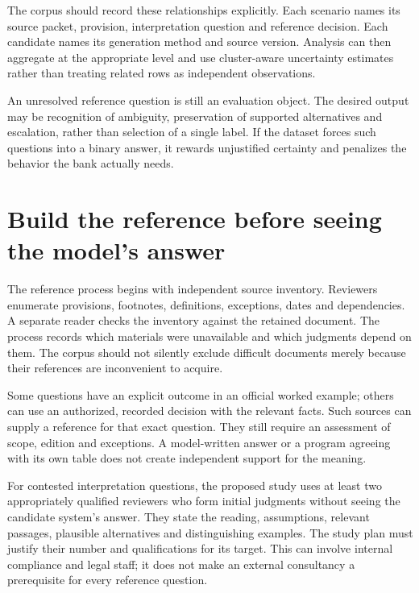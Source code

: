 The corpus should record these relationships explicitly. Each scenario names its
source packet, provision, interpretation question and reference decision. Each
candidate names its generation method and source version. Analysis can then
aggregate at the appropriate level and use cluster-aware uncertainty estimates
rather than treating related rows as independent observations.

An unresolved reference question is still an evaluation object. The desired
output may be recognition of ambiguity, preservation of supported alternatives
and escalation, rather than selection of a single label. If the dataset forces
such questions into a binary answer, it rewards unjustified certainty and
penalizes the behavior the bank actually needs.

\section{Build the reference before seeing the model's answer}
\label{merge:M09:02}


The reference process begins with independent source inventory. Reviewers enumerate
provisions, footnotes, definitions, exceptions, dates and dependencies. A separate
reader checks the inventory against the retained document. The process records
which materials were unavailable and which judgments depend on them. The corpus
should not silently exclude difficult documents merely because their references
are inconvenient to acquire.

Some questions have an explicit outcome in an official worked example; others
can use an authorized, recorded decision with the relevant facts. Such sources
can supply a reference for that exact question. They still require an assessment
of scope, edition and exceptions. A model-written answer or a program agreeing
with its own table does not create independent support for the meaning.

For contested interpretation questions, the proposed study uses at least two
appropriately qualified reviewers who form initial judgments without seeing
the candidate system's answer. They state the reading, assumptions, relevant
passages, plausible alternatives and distinguishing examples. The study plan
must justify their number and qualifications for its target. This can involve
internal compliance and legal staff; it does not make an external consultancy
a prerequisite for every reference question.

